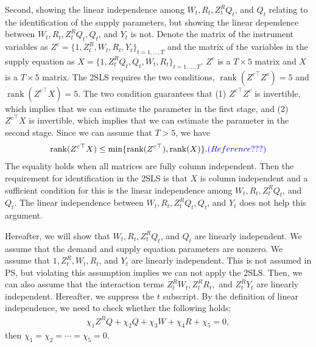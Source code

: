 \documentclass[11pt, a4paper]{article}
\DeclareMathOperator{\rank}{rank}
\begin{document}
Second, showing the linear independence among $W_{t}, R_{t}, Z^{R}_{t}Q_{t}$, and $Q_{t}$ relating to the identification of the supply parameters, but showing the linear dependence between $W_{t}, R_{t}, Z^{R}_{t}Q_{t}, Q_{t}$, and $Y_t$ is not.
Denote the matrix of the instrument variables as $Z^c = \{1, Z^R_t, W_t, R_t, Y_t\}_{t = 1,\ldots, T}$ and the matrix of the variables in the supply equation as $X = \{1, Z^R_{t}Q_{t}, Q_{t}, W_{t}, R_{t}\}_{t = 1,\ldots, T}$.
$Z^c$ is a $T\times 5$ matrix and $X$ is a $T\times 5$ matrix.
The 2SLS requires the two conditions, $\rank({Z^c}^\top Z^c) = 5$ and $\rank({Z^c}^\top X) = 5$.
The two condition guarantees that (1) ${Z^c}^\top Z^c$ is invertible, which implies that we can estimate the parameter in the first stage, and (2)  ${Z^c}^\top X$ is invertible, which implies that we can estimate the parameter in the second stage.
Since we can assume that $T> 5$, we have
\begin{align}\label{eq:rank_condition}
    \rank({Z^c}^\top X) \le \min\{ \rank({Z^c}^\top), \rank(X)\}.\textcolor{blue}{(Reference???)}
\end{align}
The equality holds when all matrices are fully column independent.
Then the requirement for identification in the 2SLS is that $X$ is column independent and a sufficient condition for this is the linear independence among $W_{t}, R_{t}, Z^{R}_{t}Q_{t}$, and $Q_{t}$.
The linear independence between $W_{t}, R_{t}, Z^{R}_{t}Q_{t}, Q_{t}$, and $Y_t$ does not help this argument.

Hereafter, we will show that $W_{t}, R_{t}, Z^{R}_{t}Q_{t}$, and $Q_{t}$ are linearly independent.
We assume that the demand and supply equation parameters are nonzero.
We assume that $1, Z^R_t, W_t, R_t$, and $Y_t$ are linearly independent.
This is not assumed in PS, but violating this assumption implies we can not apply the 2SLS.
Then, we can also assume that the interaction terms $Z^R_tW_t, Z^R_tR_t,$ and $ Z^R_t Y_t$ are linearly independent.
Hereafter, we suppress the $t$ subscript.
By the definition of linear independence, we need to check whether the following holds;
\begin{align}
    \chi_1 Z^R Q + \chi_2 Q + \chi_3 W + \chi_4 R + \chi_5 = 0, \label{eq:linear_independence}
\end{align}
then $\chi_1 = \chi_2 = \cdots = \chi_5 = 0$.
\end{document}
